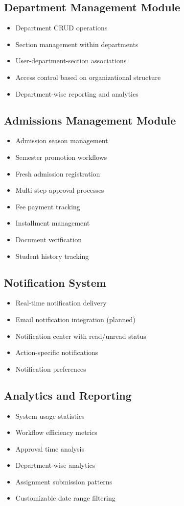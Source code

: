 \subsection{Department Management Module}
\begin{itemize}[itemsep=3pt]
\item Department CRUD operations
\item Section management within departments
\item User-department-section associations
\item Access control based on organizational structure
\item Department-wise reporting and analytics
\end{itemize}

\subsection{Admissions Management Module}
\begin{itemize}[itemsep=3pt]
\item Admission season management
\item Semester promotion workflows
\item Fresh admission registration
\item Multi-step approval processes
\item Fee payment tracking
\item Installment management
\item Document verification
\item Student history tracking
\end{itemize}

\subsection{Notification System}
\begin{itemize}[itemsep=3pt]
\item Real-time notification delivery
\item Email notification integration (planned)
\item Notification center with read/unread status
\item Action-specific notifications
\item Notification preferences
\end{itemize}

\subsection{Analytics and Reporting}
\begin{itemize}[itemsep=3pt]
\item System usage statistics
\item Workflow efficiency metrics
\item Approval time analysis
\item Department-wise analytics
\item Assignment submission patterns
\item Customizable date range filtering
\end{itemize}

